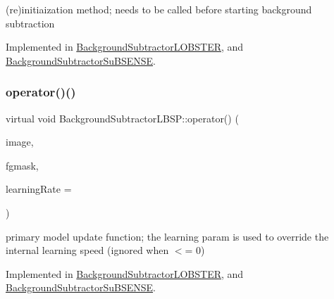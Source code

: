 (re)initiaization method; needs to be called before starting background subtraction 



Implemented in \mbox{\hyperlink{class_background_subtractor_l_o_b_s_t_e_r_a452bea31dcbd2e10efc701cc2cd25776}{Background\+Subtractor\+L\+O\+B\+S\+T\+ER}}, and \mbox{\hyperlink{class_background_subtractor_su_b_s_e_n_s_e_ac84aa66030b04a72435ef473cf0e6a3f}{Background\+Subtractor\+Su\+B\+S\+E\+N\+SE}}.

\mbox{\label{class_background_subtractor_l_b_s_p_a4771cac59b7ac865d6ec25cbf049948e}} 
\subsubsection{\texorpdfstring{operator()()}{operator()()}}
{\footnotesize\ttfamily virtual void Background\+Subtractor\+L\+B\+S\+P\+::operator() (\begin{DoxyParamCaption}\item[{cv\+::\+Input\+Array}]{image,  }\item[{cv\+::\+Output\+Array}]{fgmask,  }\item[{double}]{learning\+Rate = {} }\end{DoxyParamCaption})\hspace{0.3cm}{\ttfamily [pure virtual]}}



primary model update function; the learning param is used to override the internal learning speed (ignored when $<$= 0) 



Implemented in \mbox{\hyperlink{class_background_subtractor_l_o_b_s_t_e_r_a0c0faf2754a7a74a6ae56cea47207070}{Background\+Subtractor\+L\+O\+B\+S\+T\+ER}}, and \mbox{\hyperlink{class_background_subtractor_su_b_s_e_n_s_e_aaa60e2883c2b2cf130820b10104a653b}{Background\+Subtractor\+Su\+B\+S\+E\+N\+SE}}.

\mbox{\label{class_background_subtractor_l_b_s_p_a31b8474f8b4ffa6ef08ec682cfcef9b0}} 
